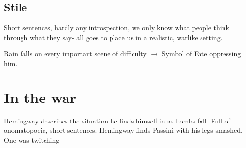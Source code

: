 \documentclass{article}
\begin{document}
\subsection{Stile}
Short sentences, hardly any introspection, we only know what people think through what they say- all goes to place us in a realistic, warlike setting.

Rain falls on every important scene of difficulty $\to$ Symbol of Fate oppressing him.
\section{In the war}
Hemingway describes the situation he finds himself in as bombs fall. Full of onomatopoeia, short sentences. Hemingway finds Passini with his legs smashed. One was twitching
\end{document}
